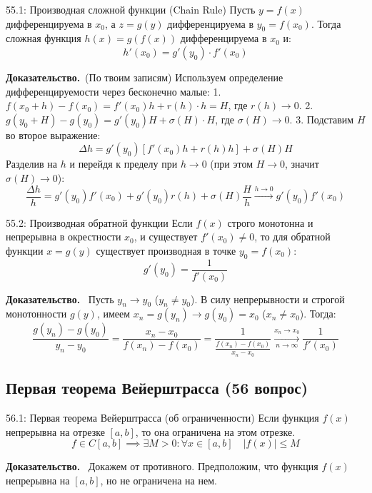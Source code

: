 \documentclass[a4paper,12pt]{article}
\newcommand{\myproof}{\textbf{Доказательство.}\ }
\begin{document}
	\begin{theorembox}{55.1: Производная сложной функции (Chain Rule)}
		Пусть $y = f(x)$ дифференцируема в $x_0$, а $z = g(y)$ дифференцируема в $y_0 = f(x_0)$. Тогда сложная функция $h(x) = g(f(x))$ дифференцируема в $x_0$ и:
		$$ h'(x_0) = g'(y_0) \cdot f'(x_0) $$
	\end{theorembox}
	
	\myproof (По твоим записям)
	Используем определение дифференцируемости через бесконечно малые:
	1. $f(x_0+h) - f(x_0) = f'(x_0)h + r(h) \cdot h = H$, где $r(h) \to 0$.
	2. $g(y_0+H) - g(y_0) = g'(y_0)H + \sigma(H) \cdot H$, где $\sigma(H) \to 0$.
	3. Подставим $H$ во второе выражение:
	$$ \Delta h = g'(y_0)[f'(x_0)h + r(h)h] + \sigma(H)H $$
	Разделив на $h$ и перейдя к пределу при $h \to 0$ (при этом $H \to 0$, значит $\sigma(H) \to 0$):
	$$ \frac{\Delta h}{h} = g'(y_0)f'(x_0) + g'(y_0)r(h) + \sigma(H)\frac{H}{h} \xrightarrow{h \to 0} g'(y_0)f'(x_0) $$
	
	\begin{theorembox}{55.2: Производная обратной функции}
		Если $f(x)$ строго монотонна и непрерывна в окрестности $x_0$, и существует $f'(x_0) \neq 0$, то для обратной функции $x = g(y)$ существует производная в точке $y_0 = f(x_0)$:
		$$ g'(y_0) = \frac{1}{f'(x_0)} $$
	\end{theorembox}
	
	\vspace{0.5cm}
	\myproof
	Пусть $y_n \to y_0$ ($y_n \neq y_0$). В силу непрерывности и строгой монотонности $g(y)$, имеем $x_n = g(y_n) \to g(y_0) = x_0$ ($x_n \neq x_0$).
	Тогда:
	$$ \frac{g(y_n) - g(y_0)}{y_n - y_0} = \frac{x_n - x_0}{f(x_n) - f(x_0)} = \frac{1}{\frac{f(x_n) - f(x_0)}{x_n - x_0}} \xrightarrow[n \to \infty]{x_n \to x_0} \frac{1}{f'(x_0)} $$
	
	

	
	\subsection{Первая теорема Вейерштрасса (56 вопрос)}
	
	\begin{theorembox}{56.1: Первая теорема Вейерштрасса (об ограниченности)}
		Если функция $f(x)$ непрерывна на отрезке $[a, b]$, то она ограничена на этом отрезке.
		$$ f \in C[a, b] \implies \exists M > 0 : \forall x \in [a, b] \quad |f(x)| \leq M $$
	\end{theorembox}
	
	\vspace{0.5cm}
	\myproof
	Докажем от противного. Предположим, что функция $f(x)$ непрерывна на $[a, b]$, но не ограничена на нем.
	
\end{document}
